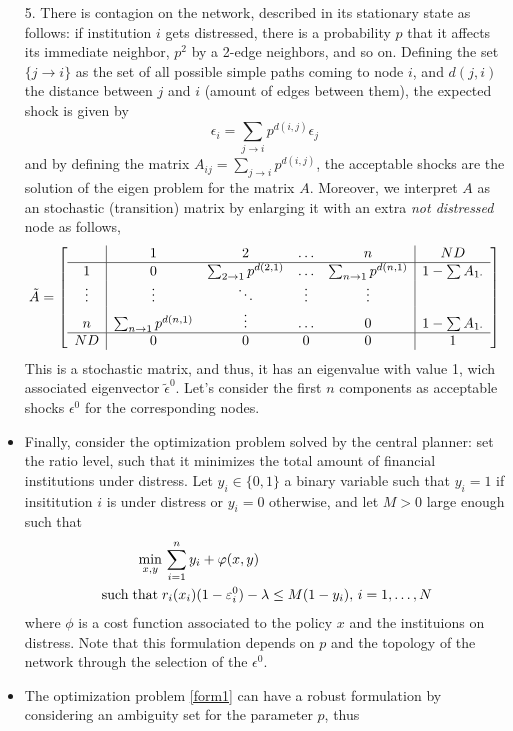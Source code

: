 \begin{itemize}
\item[5.] There is contagion on the network, described in its stationary state as follows: if institution $i$ gets distressed, there is a probability $p$ that it affects its immediate neighbor, $p^2$ by a 2-edge neighbors, and so on.  Defining the set $\{j\to i\}$ as the set of all possible simple paths coming to node $i$, and $d(j,i)$ the distance between $j$ and $i$ (amount of edges between them), the expected shock is given by
\[\epsilon_i=\sum_{j\to i} p^{d(i,j)}\epsilon_j\]
and by defining the matrix $A_{ij}=\sum_{j\to i} p^{d(i,j)}$, the acceptable shocks are the solution of the eigen problem for the matrix $A$.  Moreover, we interpret $A$ as an stochastic (transition) matrix by enlarging it with an extra \emph{not distressed} node as follows,
\[\Tilde A=\left[\begin{array}{c|cccc|c}
&1&2&\ldots&n&ND\\
\hline
1&0&\sum_{2\to 1} p^{d(2,1)}&\ldots&\sum_{n\to 1} p^{d(n,1)}&1-\sum A_{1\cdot}\\
\vdots&\vdots&\ddots&\vdots&\vdots\\
n&\sum_{n\to 1} p^{d(n,1)}&\vdots&\ldots&0&1-\sum A_{1\cdot}\\
\hline
ND&0&0&0&0&1
\end{array}\right]\] 
This is a stochastic matrix, and thus, it has an eigenvalue with value 1, wich associated eigenvector $\tilde \epsilon^0$.  Let's consider the first $n$ components as acceptable shocks $\epsilon^0$ for the corresponding nodes.
\item Finally, consider the optimization problem solved by the central planner: set the ratio level, such that it minimizes the total amount of financial institutions under distress.  Let $y_i\in\{0,1\}$ a binary variable such that $y_i=1$ if insititution $i$ is under distress or $y_i=0$ otherwise, and let $M>0$ large enough such that
\begin{align}\label{form1}
\min_{x,y}&\,\sum_{i=1}^n y_i+\varphi(x,y)\\
\mathop{\rm \;such\; that\;}\nolimits&r_i(x_i)(1-\varepsilon^0_i)-\lambda\leq M(1-y_i),\,i=1,\ldots,N
\end{align}
where $\phi$ is a cost function associated to the policy $x$ and the instituions on distress.  Note that this formulation depends on $p$ and the topology of the network through the selection of the $\epsilon^0$.
\item The optimization problem \ref{form1} can have a robust formulation by considering an ambiguity set for the parameter $p$, thus

\end{itemize}
